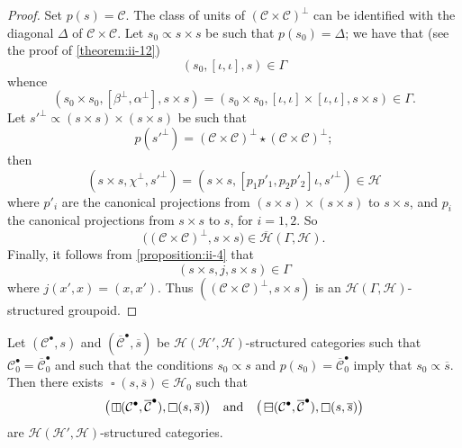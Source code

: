 \documentclass[a4paper,fleqn]{article}
\theoremstyle{plain}
\newenvironment{theorem}[1]
  {\renewcommand\theinnertheorem{#1}\innertheorem}
  {\endinnertheorem}
\theoremstyle{definition}
\newcommand{\oldpage}[1]{{\marginpar{\footnotesize$\bigg\vert$\,\,\,\,\textit{p.~#1}}}}
\newcommand{\textand}{\quad\text{and}\quad}
\newcommand{\CC}{\mathcal{C}}
\newcommand{\HH}{\mathcal{H}}
\newcommand{\subs}{\mathrel{\propto}}
\newcommand{\hsqbox}{{\boxminus}}
\newcommand{\vsqbox}{{\rotatebox{90}{$\boxminus$}}}
\DeclareMathOperator{\sq}{\square}
\DeclareMathOperator{\hsq}{\raisebox{-.05em}{$\hsqbox$}}
\DeclareMathOperator{\vsq}{\raisebox{-.1em}{$\vsqbox$}}
\begin{document}
\begin{proof}
  Set $p(s)=\CC$.
  The class of units of $(\CC\times\CC)^\perp$ can be identified with the diagonal $\Delta$ of $\CC\times\CC$.
  Let $s_0\subs s\times s$ be such that $p(s_0)=\Delta$;
  we have that (see the proof of \cref{theorem:ii-12})
  \[
    (s_0,[\iota,\iota],s)
    \in \Gamma
  \]
  whence
  \[
    (s_0\times s_0,[\beta^\perp,\alpha^\perp],s\times s)
    = (s_0\times s_0,[\iota,\iota]\times[\iota,\iota],s\times s)
    \in\Gamma.
  \]
  Let $s'^\perp\subs(s\times s)\times(s\times s)$ be such that
  \[
    p(s'^\perp)
    = (\CC\times\CC)^\perp\star(\CC\times\CC)^\perp;
  \]
  then
  \[
    (s\times s,\chi^\perp,s'^\perp)
    = (s\times s,[p_1p'_1,p_2p'_2]\iota,s'^\perp)
    \in\HH
  \]
  where $p'_i$ are the canonical projections from $(s\times s)\times(s\times s)$ to $s\times s$, and $p_i$ the canonical projections from $s\times s$ to $s$, for $i=1,2$.
  So
  \[
    \big((\CC\times\CC)^\perp,s\times s\big)
    \in\overline{\HH}(\Gamma,\HH).
  \]
  Finally, it follows from \cref{proposition:ii-4} that
  \[
    (s\times s,j,s\times s)\in\Gamma
  \]
  where $j(x',x)=(x,x')$.
  Thus $((\CC\times\CC)^\perp,s\times s)$ is an $\HH(\Gamma,\HH)$-structured groupoid.
\end{proof}

\begin{theorem}{15}
\label{theorem:ii-15}
  Let $(\CC^\bullet,s)$ and $(\overline{\CC}^\bullet,\overline{s})$ be $\HH(\HH',\HH)$-structured categories such that $\CC_0^\bullet=\overline{\CC}_0^\bullet$ and such that the conditions $s_0\subs s$ and $p(s_0)=\overline{\CC}_0^\bullet$ imply that $s_0\subs\overline{s}$.
  \oldpage{419}
  Then there exists $\sq(s,\overline{s})\in\HH_0$ such that
  \[
    \big(\vsq(\CC^\bullet,\overline{\CC}^\bullet),\sq(s,\overline{s})\big)
    \textand
    \big(\hsq(\CC^\bullet,\overline{\CC}^\bullet),\sq(s,\overline{s})\big)
  \]
  are $\HH(\HH',\HH)$-structured categories.
\end{theorem}
\end{document}
